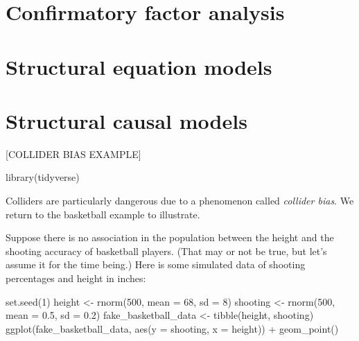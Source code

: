 \documentclass[
]{book}
\newenvironment{Shaded}{\begin{snugshade}}{\end{snugshade}}
\newcommand{\AttributeTok}[1]{\textcolor[rgb]{0.77,0.63,0.00}{#1}}
\newcommand{\DecValTok}[1]{\textcolor[rgb]{0.00,0.00,0.81}{#1}}
\newcommand{\FloatTok}[1]{\textcolor[rgb]{0.00,0.00,0.81}{#1}}
\newcommand{\FunctionTok}[1]{\textcolor[rgb]{0.00,0.00,0.00}{#1}}
\newcommand{\NormalTok}[1]{#1}
\newcommand{\OtherTok}[1]{\textcolor[rgb]{0.56,0.35,0.01}{#1}}
\newcommand{\SpecialCharTok}[1]{\textcolor[rgb]{0.00,0.00,0.00}{#1}}
\begin{document}
\hypertarget{cfa}{%
\chapter{Confirmatory factor analysis}\label{cfa}}

\hypertarget{sem}{%
\chapter{Structural equation models}\label{sem}}

\hypertarget{scm}{%
\chapter{Structural causal models}\label{scm}}

{[}COLLIDER BIAS EXAMPLE{]}

\begin{Shaded}
\begin{Highlighting}[]
\FunctionTok{library}\NormalTok{(tidyverse)}
\end{Highlighting}
\end{Shaded}

Colliders are particularly dangerous due to a phenomenon called \emph{collider bias}. We return to the basketball example to illustrate.

Suppose there is no association in the population between the height and the shooting accuracy of basketball players. (That may or not be true, but let's assume it for the time being.) Here is some simulated data of shooting percentages and height in inches:

\begin{Shaded}
\begin{Highlighting}[]
\FunctionTok{set.seed}\NormalTok{(}\DecValTok{1}\NormalTok{)}
\NormalTok{height }\OtherTok{\textless{}{-}} \FunctionTok{rnorm}\NormalTok{(}\DecValTok{500}\NormalTok{, }\AttributeTok{mean =} \DecValTok{68}\NormalTok{, }\AttributeTok{sd =} \DecValTok{8}\NormalTok{)}
\NormalTok{shooting }\OtherTok{\textless{}{-}} \FunctionTok{rnorm}\NormalTok{(}\DecValTok{500}\NormalTok{, }\AttributeTok{mean =} \FloatTok{0.5}\NormalTok{, }\AttributeTok{sd =} \FloatTok{0.2}\NormalTok{)}
\NormalTok{fake\_basketball\_data }\OtherTok{\textless{}{-}} \FunctionTok{tibble}\NormalTok{(height, shooting)}
\FunctionTok{ggplot}\NormalTok{(fake\_basketball\_data, }\FunctionTok{aes}\NormalTok{(}\AttributeTok{y =}\NormalTok{ shooting, }\AttributeTok{x =}\NormalTok{ height)) }\SpecialCharTok{+}
    \FunctionTok{geom\_point}\NormalTok{()}
\end{Highlighting}
\end{Shaded}
\end{document}
